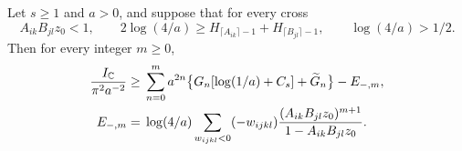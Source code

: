 \begin{proposition}\label{pf:overlap}
Let $s\ge1$ and $a>0$, and suppose that for every cross
\begin{equation}\label{pf:cross-threshold}
 A_{ik}B_{jl}z_0<1,\qquad
 2\log(4/a)\ge H_{\lceil A_{ik}\rceil-1}+H_{\lceil B_{jl}\rceil-1},
 \qquad \log(4/a)>1/2 .
\end{equation}
Then for every integer $m\ge0$,
\begin{equation}\label{pf:collected-overlap}
 \begin{split}
 \frac{I_\mathbb C}{\pi^2a^{-2}}\ge{}&
 \sum_{n=0}^ma^{2n}\bigl\{G_n[\log(1/a)+C_s]+\widetilde G_n\bigr\}-E_{-,m},\\
 E_{-,m}={}&\log(4/a)\sum_{w_{ijkl}<0}(-w_{ijkl})
 \frac{(A_{ik}B_{jl}z_0)^{m+1}}{1-A_{ik}B_{jl}z_0}.
 \end{split}
\end{equation}
\end{proposition}

